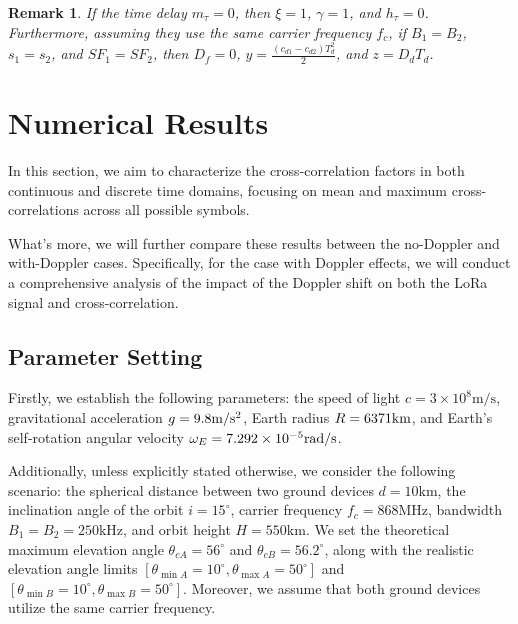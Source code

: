 \documentclass{IEEEtaes}
\theoremstyle{plain}
\newtheorem{remark}{Remark}
\begin{document}
\begin{remark}
If the time delay $m_\tau=0$, then $\xi =1$, $\gamma = 1$, and $h_\tau=0$. Furthermore, assuming they use the same carrier frequency $f_c$, if $B_1 = B_2$, $s_1 = s_2$, and $SF_1 = SF_2$, then $D_f=0$, $y = \frac{(c_{d1}-c_{d2})T_d^2}{2}$, and $z = D_dT_d$.%
\end{remark}

\section{Numerical Results} \label{Numerical_results}
In this section, we aim to characterize the cross-correlation factors in both continuous and discrete time domains, focusing on mean and maximum cross-correlations across all possible symbols. 

What's more, we will further compare these results between the no-Doppler and with-Doppler cases. Specifically, for the case with Doppler effects, we will conduct a comprehensive analysis of the impact of the Doppler shift on both the LoRa signal and cross-correlation. 


\subsection{Parameter Setting}\label{para_setting}
Firstly, we establish the following parameters: the speed of light $c = 3\times 10^8\text{m/s}$, gravitational acceleration $g = 9.8 \rm{m/s^2}$, Earth radius $R = 6371\rm{km}$, and Earth's self-rotation angular velocity $\omega_E = 7.292\times 10^{-5}\rm{rad/s}$.

Additionally, unless explicitly stated otherwise, we consider the following scenario: the spherical distance between two ground devices $d = 10$km, the inclination angle of the orbit $i = 15^\circ$, carrier frequency $f_c = 868$MHz, bandwidth $B_1 = B_2 = 250$kHz, and orbit height $H = 550$km. We set the theoretical maximum elevation angle $\theta_{c\!A}=56^\circ$ and $\theta_{c\!B}=56.2^\circ$, along with the realistic elevation angle limits $[\theta_{\min \!A}=10^\circ, \theta_{\max \!A}=50^\circ]$ and $[\theta_{\min \!B}=10^\circ, \theta_{\max \!B}=50^\circ]$. Moreover, we assume that both ground devices utilize the same carrier frequency. 
\end{document}
